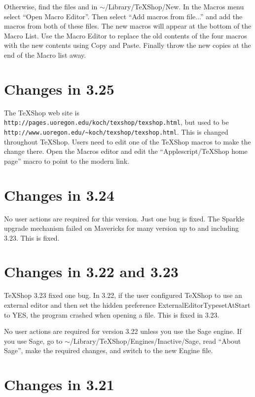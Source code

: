 \documentclass[11pt, oneside]{amsart}
\begin{document}
Otherwise, find the files  and 
in $\sim$/Library/TeXShop/New. In the Macros menu select ``Open Macro Editor''. Then
select ``Add macros from file...'' and add the macros from both of these files. The
new macros will appear at the bottom of the Macro List. Use the Macro Editor to
replace the old contents of the four macros with the new contents using Copy and Paste.
Finally throw the new copies at the end of the Macro list away.

 
\section{Changes in 3.25} 

The TeXShop web site is \nolinkurl{http://pages.uoregon.edu/koch/texshop/texshop.html}, but used to be \nolinkurl{http://www.uoregon.edu/~koch/texshop/texshop.html}. This is changed throughout TeXShop. Users need to edit one of the TeXShop macros to make the change there. Open the Macros editor and edit the 
``Applescript/TeXShop home page'' macro to point to the modern link.
 
\section{Changes in 3.24}

No user actions are required for this version. Just one bug is fixed. The Sparkle
upgrade mechanism failed on Mavericks for many version up to and including 3.23. This
is fixed.

\section{Changes in 3.22 and 3.23}

TeXShop 3.23 fixed one bug. In 3.22, if the user configured TeXShop to use an external editor
and then set the hidden preference ExternalEditorTypesetAtStart to YES,  the program crashed when opening a file. This is fixed in 3.23.

No user actions are required for version 3.22 unless you use the Sage engine. If you use Sage, go to $\sim$/Library/TeXShop/Engines/Inactive/Sage, read ``About Sage'', make the required changes, and switch to the new Engine file.

\section{Changes in 3.21}
\end{document}
